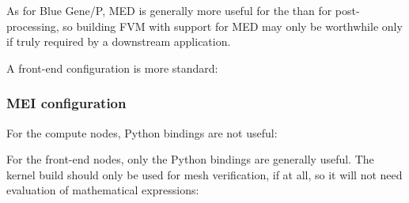 \documentclass[a4paper,10pt,twoside]{article}
\begin{document}
As for Blue Gene/P, MED is generally more useful for the \pcs than
for post-processing, so building FVM with support for MED may only be worthwhile
only if truly required by a downstream application.

A front-end configuration is more standard:


\subsubsection{MEI configuration}

For the compute nodes, Python bindings are not useful:


For the front-end nodes, only the Python bindings are generally useful. The
kernel build should only be used for mesh verification, if at
all, so it will not need evaluation of mathematical expressions:
\end{document}
